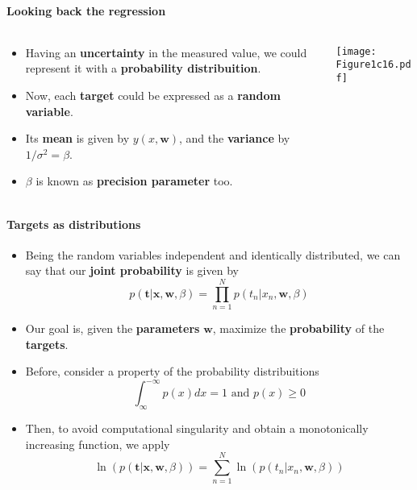
\begin{frame}{\insertsubsection}
	\framesubtitle{Looking back the regression}
	\begin{columns}
	\begin{column}{0.475\textwidth}
		\begin{itemize}
			\item Having an \textcolor{UniOrange}{\textbf{uncertainty}} in the measured value, we could represent it with a \textcolor{UniOrange}{\textbf{probability distribuition}}.
			\item Now, each \textcolor{UniOrange}{\textbf{target}} could be expressed as a \textcolor{UniOrange}{\textbf{random variable}}.
			\item Its \textcolor{UniOrange}{\textbf{mean}} is given by $y(x,\mathbf{w})$, and the \textcolor{UniOrange}{\textbf{variance}} by $1/\sigma^2 = \beta$.
			\item $\beta$ is known as \textcolor{UniOrange}{\textbf{precision parameter}} too.
		\end{itemize}
		\end{column}
		\begin{column}{0.475\textwidth}  %
			\begin{center}
				\texttt{[image: Figure1c16.pdf]}
			\end{center}
		\end{column}
	\end{columns}
\end{frame}

\begin{frame}{\insertsubsection}	
	\framesubtitle{Targets as distributions}
	\begin{itemize}
		\item Being the random variables independent and identically distributed, we can say that our \textcolor{UniOrange}{\textbf{joint probability}} is given by
	\begin{equation*}
		p(\mathbf{t} | \mathbf{x}, \mathbf{w}, \beta) = \prod_{n=1}^N p \left( t_n | x_n, \mathbf{w}, \beta \right)
	\end{equation*}
		\item Our goal is, given the \textcolor{UniOrange}{\textbf{parameters}} $\mathbf{w}$, maximize the \textcolor{UniOrange}{\textbf{probability}} of the \textcolor{UniOrange}{\textbf{targets}}.
		\item  Before, consider a property of the probability distribuitions
		\begin{equation*}
		\int_\infty ^{-\infty} p(x) dx = 1 \text{ and } p(x) \geq 0
		\end{equation*}
		\item Then, to avoid computational singularity and obtain a monotonically increasing function, we apply
		\begin{equation*}
			\ln \left( p( \mathbf{t}| \mathbf{x}, \mathbf{w}, \beta) \right) = \sum_{n=1}^N \ln \left(   p \left( t_n | x_n, \mathbf{w}, \beta \right) \right)
		\end{equation*}		
	\end{itemize}
\end{frame}


